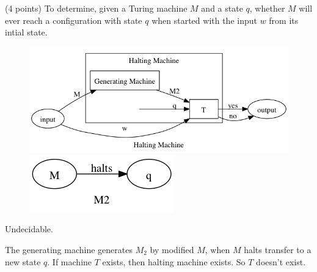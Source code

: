 \documentclass[paper=a4, fontsize=11pt]{scrartcl} %
\begin{document}
\maketitle %



\section{}
\begin{fancyquotes}
  (4 points) To determine, given a Turing machine $M$ and a state
  $q$, whether $M$ will ever reach a configuration with state $q$
  when started with the input $w$ from its intial state.
\end{fancyquotes}

\begin{figure}[H]
  \centering
  \includegraphics[width=\textwidth]{9-1.gv.png}
  \includegraphics[width=.4\textwidth]{9-1.gv.2.png}
\end{figure}

Undecidable.

The generating machine generates $M_2$ by modified $M$, when $M$
halts transfer to a new state $q$. If machine $T$ exists, then halting
machine exists. So $T$ doesn't exist.
\end{document}
